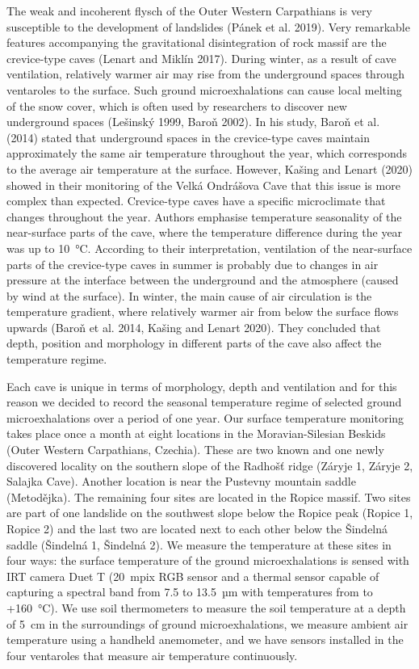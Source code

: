 {The weak and incoherent flysch of the Outer Western Carpathians is very susceptible to the development of landslides (Pánek et al. 2019). Very remarkable features accompanying the gravitational disintegration of rock massif are the crevice-type caves (Lenart and Miklín 2017). During winter, as a result of cave ventilation, relatively warmer air may rise from the underground spaces through ventaroles to the surface. Such ground microexhalations can cause local melting of the snow cover, which is often used by researchers to discover new underground spaces (Lešinský 1999, Baroň 2002). In his study, Baroň et al. (2014) stated that underground spaces in the crevice-type caves maintain approximately the same air temperature throughout the year, which corresponds to the average air temperature at the surface. However, Kašing and Lenart (2020) showed in their monitoring of the Velká Ondrášova Cave that this issue is more complex than expected. Crevice-type caves have a specific microclimate that changes throughout the year. Authors emphasise temperature seasonality of the near-surface parts of the cave, where the temperature difference during the year was up to 10~°C. According to their interpretation, ventilation of the near-surface parts of the crevice-type caves in summer is probably due to changes in air pressure at the interface between the underground and the atmosphere (caused by wind at the surface). In winter, the main cause of air circulation is the temperature gradient, where relatively warmer air from below the surface flows upwards (Baroň et al. 2014, Kašing and Lenart 2020). They concluded that depth, position and morphology in different parts of the cave also affect the temperature regime.

Each cave is unique in terms of morphology, depth and ventilation and for this reason we decided to record the seasonal temperature regime of selected ground microexhalations over a period of one year. Our surface temperature monitoring takes place once a month at eight locations in the Moravian-Silesian Beskids (Outer Western Carpathians, Czechia). These are two known and one newly discovered locality on the southern slope of the Radhošť ridge (Záryje 1, Záryje 2, Salajka Cave). Another location is near the Pustevny mountain saddle (Metodějka). The remaining four sites are located in the Ropice massif. Two sites are part of one landslide on the southwest slope below the Ropice peak (Ropice 1, Ropice 2) and the last two are located next to each other below the Šindelná saddle (Šindelná 1, Šindelná 2). We measure the temperature at these sites in four ways: the surface temperature of the ground microexhalations is sensed with IRT camera Duet T (20~mpix RGB sensor and a thermal sensor capable of capturing a spectral band from 7.5 to 13.5~µm with temperatures from  to +160~°C). We use soil thermometers to measure the soil temperature at a depth of 5~cm in the surroundings of ground microexhalations, we measure ambient air temperature using a handheld anemometer, and we have sensors installed in the four ventaroles that measure air temperature continuously.

}
